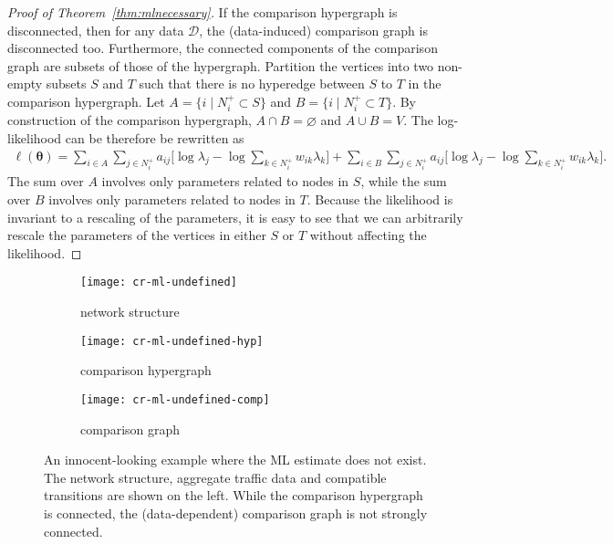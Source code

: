 \begin{proof}[Proof of Theorem~\ref{thm:mlnecessary}]
If the comparison hypergraph is disconnected, then for any data $\mathcal{D}$, the (data-induced) comparison graph is disconnected too.
Furthermore, the connected components of the comparison graph are subsets of those of the hypergraph.
Partition the vertices into two non-empty subsets $S$ and $T$ such that there is no hyperedge between $S$ to $T$ in the comparison hypergraph.
Let $A = \{ i \mid N^+_i \subset S \}$ and $B = \{ i \mid N^+_i \subset T \}$.
By construction of the comparison hypergraph, $A \cap B = \varnothing$ and $A \cup B = V$.
The log-likelihood can be therefore be rewritten as
\begin{align*}
\ell(\bm{\theta}) =
    \sum_{i \in A} \sum_{j \in N^+_i} a_{ij} \bigg[ \log \lambda_j - \log \sum_{k \in N^+_i} w_{ik} \lambda_k \bigg]
    + \sum_{i \in B} \sum_{j \in N^+_i} a_{ij} \bigg[ \log \lambda_j - \log \sum_{k \in N^+_i} w_{ik} \lambda_k \bigg].
\end{align*}
The sum over $A$ involves only parameters related to nodes in $S$, while the sum over $B$ involves only parameters related to nodes in $T$.
Because the likelihood is invariant to a rescaling of the parameters, it is easy to see that we can arbitrarily rescale the parameters of the vertices in either $S$ or $T$ without affecting the likelihood.
\end{proof}

\begin{figure*}[t]
  \begin{subfigure}{.33\textwidth}
    \centering
    \texttt{[image: cr-ml-undefined]}
    \caption{network structure}
  \end{subfigure}%
  \begin{subfigure}{.33\textwidth}
    \centering
    \texttt{[image: cr-ml-undefined-hyp]}
    \caption{comparison hypergraph}
  \end{subfigure}
  \begin{subfigure}{.33\textwidth}
    \centering
    \texttt{[image: cr-ml-undefined-comp]}
    \caption{comparison graph}
  \end{subfigure}
  \caption{An innocent-looking example where the ML estimate does not exist.
  The network structure, aggregate traffic data and compatible transitions are shown on the left.
  While the comparison hypergraph is connected, the (data-dependent) comparison graph is not strongly connected.}
  \label{fig:badexample}
\end{figure*}

